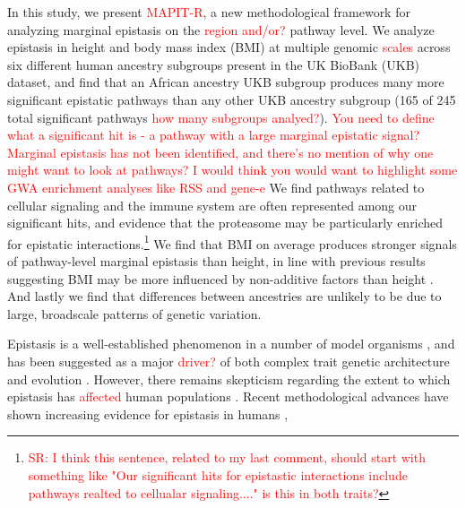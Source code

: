 \documentclass[12pt,a4paper]{article}
\newcommand{\red}[1]{\textcolor{red}{#1}}
\begin{document}
In this study, we present \red{MAPIT-R}, a new methodological framework for analyzing marginal epistasis on the \red{region and/or?} pathway level. We analyze epistasis in height and body mass index (BMI) at multiple genomic \red{scales} across six different human ancestry subgroups present in the UK BioBank (UKB) \citep{Sudlow2015} dataset, and find that an African ancestry UKB subgroup produces many more significant epistatic pathways than any other UKB ancestry subgroup (165 of 245 total significant pathways \red{how many subgroups analyed?}). \red{You need to define what a significant hit is - a pathway with a large marginal epistatic signal? Marginal epistasis has not been identified, and there's no mention of why one might want to look at pathways? I would think you would want to highlight some GWA enrichment analyses like RSS and gene-e} We find pathways related to cellular signaling and the immune system are often represented among our significant hits, and evidence that the proteasome may be particularly enriched for epistatic interactions.\footnote{\red{SR: I think this sentence, related to my last comment, should start with something like "Our significant hits for epistastic interactions include pathways realted to cellualar signaling...." is this in both traits?}} We find that BMI on average produces stronger signals of pathway-level marginal epistasis than height, in line with previous results suggesting BMI may be more influenced by non-additive factors than height \citep{Elks2012,Visscher2012}. And lastly we find that differences between ancestries are unlikely to be due to large, broadscale patterns of genetic variation.  




Epistasis is a well-established phenomenon in a number of model organisms \citep{Lehner2006,Rowe2008,Shao2008,Flint2009,Costanzo2010,He2010,Jarvis2011,Pettersson2011,Bloom2013,Monnahan2015}, and has been suggested as a major \red{driver?} of both complex trait genetic architecture and evolution \citep{Carlborg2004,Carlborg2006,Martin2007,Phillips2008,Moore2009,Jones2014,Mackay2014}. However, there remains skepticism regarding the extent to which epistasis has \red{affected} human populations \citep{Hill2008,Crow2010,Aschard2012,Wood2014,Yang2015}. Recent methodological advances have shown increasing evidence for epistasis in humans \citep{Verma2016,Crawford2017a,Fang2019,Runcie2019},
\end{document}
